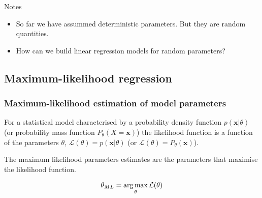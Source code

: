 \begin{frame}

\begin{alertblock}{Notes}
    \begin{itemize}
        \item So far we have assummed deterministic parameters. But they are
            random quantities.
        \item How can we build linear regression models for random parameters?
    \end{itemize}
\end{alertblock}

\end{frame}

\subsection{Maximum-likelihood regression}

\begin{frame}
    \frametitle{Maximum-likelihood estimation of model parameters}

	\scriptsize
    \begin{probDef}
        For a statistical model characterised by a probability density
        function $p(\mathbf{x}|\theta)$ (or probability mass function
        $P_\theta(X=\mathbf{x})$) the likelihood function is a function of the
        parameters $\theta$, $\mathcal{L}(\theta)=p(\mathbf{x}|\theta)$
        (or $\mathcal{L}(\theta)=P_\theta(\mathbf{x})$).
   \end{probDef}

    \begin{probDef}
        The maximum likelihood parameters estimates are the parameters that
        maximise the likelihood function.

        \begin{align*}
            \theta_{ML}=\operatorname*{arg\,max}_{\theta}\mathcal{L}(\theta)
        \end{align*}
   \end{probDef}

	\normalsize

\end{frame}


